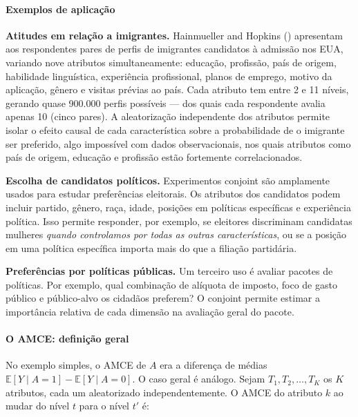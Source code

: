 \documentclass[
]{article}
\begin{document}
\paragraph{Exemplos de aplicação}\label{exemplos-de-aplicauxe7uxe3o}

\textbf{Atitudes em relação a imigrantes.} Hainmueller and Hopkins () apresentam aos respondentes pares de perfis de imigrantes candidatos à admissão nos EUA, variando nove atributos simultaneamente: educação, profissão, país de origem, habilidade linguística, experiência profissional, planos de emprego, motivo da aplicação, gênero e visitas prévias ao país. Cada atributo tem entre 2 e 11 níveis, gerando quase 900.000 perfis possíveis --- dos quais cada respondente avalia apenas 10 (cinco pares). A aleatorização independente dos atributos permite isolar o efeito causal de cada característica sobre a probabilidade de o imigrante ser preferido, algo impossível com dados observacionais, nos quais atributos como país de origem, educação e profissão estão fortemente correlacionados.

\textbf{Escolha de candidatos políticos.} Experimentos conjoint são amplamente usados para estudar preferências eleitorais. Os atributos dos candidatos podem incluir partido, gênero, raça, idade, posições em políticas específicas e experiência política. Isso permite responder, por exemplo, se eleitores discriminam candidatas mulheres \emph{quando controlamos por todas as outras características}, ou se a posição em uma política específica importa mais do que a filiação partidária.

\textbf{Preferências por políticas públicas.} Um terceiro uso é avaliar pacotes de políticas. Por exemplo, qual combinação de alíquota de imposto, foco de gasto público e público-alvo os cidadãos preferem? O conjoint permite estimar a importância relativa de cada dimensão na avaliação geral do pacote.

\paragraph{O AMCE: definição geral}\label{o-amce-definiuxe7uxe3o-geral}

No exemplo simples, o AMCE de \(A\) era a diferença de médias \(\mathbb{E}[Y \mid A=1] - \mathbb{E}[Y \mid A=0]\). O caso geral é análogo. Sejam \(T_1, T_2, \ldots, T_K\) os \(K\) atributos, cada um aleatorizado independentemente. O AMCE do atributo \(k\) ao mudar do nível \(t\) para o nível \(t'\) é:
\end{document}
